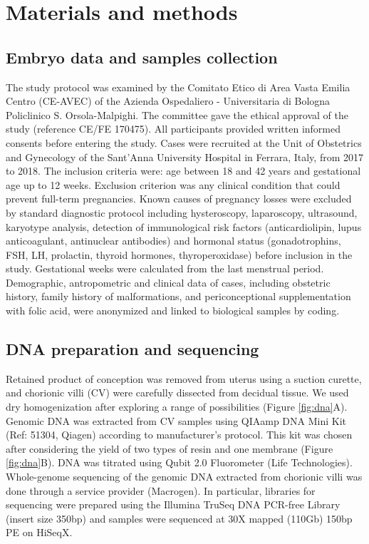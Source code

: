 \section*{Materials and methods}

\subsection*{Embryo data and samples collection}
The study protocol was examined by the Comitato Etico di Area Vasta Emilia Centro (CE-AVEC) of the Azienda Ospedaliero - Universitaria di Bologna Policlinico S. Orsola-Malpighi. The committee gave the ethical approval of the study (reference CE/FE 170475). All participants provided written informed consents before entering the study.
Cases were recruited at the Unit of Obstetrics and Gynecology of the Sant’Anna University Hospital in Ferrara, Italy, from 2017 to 2018.
The inclusion criteria were: age between 18 and 42 years and gestational age up to 12 weeks. Exclusion criterion was any clinical condition that could prevent full-term pregnancies. Known causes of pregnancy losses were excluded by standard diagnostic protocol including hysteroscopy, laparoscopy, ultrasound, karyotype analysis, detection of immunological risk factors (anticardiolipin, lupus anticoagulant, antinuclear antibodies) and hormonal status (gonadotrophins, FSH, LH, prolactin, thyroid hormones, thyroperoxidase) before inclusion in the study. Gestational weeks were calculated from the last menstrual period. Demographic, antropometric and clinical data of cases, including obstetric history, family history of malformations, and periconceptional supplementation with folic acid, were anonymized and linked to biological samples by coding. 


\subsection*{DNA preparation and sequencing} 
Retained product of conception was removed from uterus using a suction curette, and chorionic villi (CV) were carefully dissected from decidual tissue. We used dry homogenization after exploring a range of possibilities (Figure \ref{fig:dna}A). 
Genomic DNA was extracted from CV samples using QIAamp DNA Mini Kit (Ref: 51304, Qiagen) according to manufacturer’s protocol. This kit was chosen after considering the yield of two types of resin and one membrane (Figure \ref{fig:dna}B). DNA was titrated using Qubit 2.0 Fluorometer (Life Technologies).
Whole-genome sequencing of the genomic DNA extracted from chorionic villi was done through a service provider (Macrogen). In particular, libraries for sequencing were prepared using the Illumina TruSeq DNA PCR-free Library (insert size 350bp) and samples were sequenced at 30X mapped (110Gb) 150bp PE on HiSeqX. 

